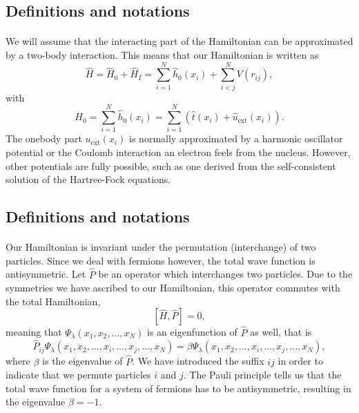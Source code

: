 \documentclass[%
twoside,                 %
final,                   %
10pt]{article}
\begin{document}
\subsection{Definitions and notations}

\paragraph{}
We will assume that the interacting part of the Hamiltonian
can be approximated by a two-body interaction.
This means that our Hamiltonian is written as 
\begin{equation}
    \hat{H} = \hat{H}_0 + \hat{H}_I 
    = \sum_{i=1}^N \hat{h}_0(x_i) + \sum_{i < j}^N V(r_{ij}),
\label{Hnuclei}
\end{equation}
with 
\begin{equation}
  H_0=\sum_{i=1}^N \hat{h}_0(x_i) =  \sum_{i=1}^N\left(\hat{t}(x_i) + \hat{u}_{\mathrm{ext}}(x_i)\right).
\label{hinuclei}
\end{equation}
The onebody part $u_{\mathrm{ext}}(x_i)$ is normally approximated by a harmonic oscillator potential or the Coulomb interaction an electron feels from the nucleus. However, other potentials are fully possible, such as 
one derived from the self-consistent solution of the Hartree-Fock equations.




\subsection{Definitions and notations}

\paragraph{}
Our Hamiltonian is invariant under the permutation (interchange) of two particles. %
Since we deal with fermions however, the total wave function is antisymmetric.
Let $\hat{P}$ be an operator which interchanges two particles.
Due to the symmetries we have ascribed to our Hamiltonian, this operator commutes with the total Hamiltonian,
\[
[\hat{H},\hat{P}] = 0,
 \]
meaning that $\Psi_{\lambda}(x_1, x_2, \dots , x_N)$ is an eigenfunction of 
$\hat{P}$ as well, that is
\[
\hat{P}_{ij}\Psi_{\lambda}(x_1, x_2, \dots,x_i,\dots,x_j,\dots,x_N)=
\beta\Psi_{\lambda}(x_1, x_2, \dots,x_i,\dots,x_j,\dots,x_N),
\]
where $\beta$ is the eigenvalue of $\hat{P}$. We have introduced the suffix $ij$ in order to indicate that we permute particles $i$ and $j$.
The Pauli principle tells us that the total wave function for a system of fermions
has to be antisymmetric, resulting in the eigenvalue $\beta = -1$.
\end{document}
